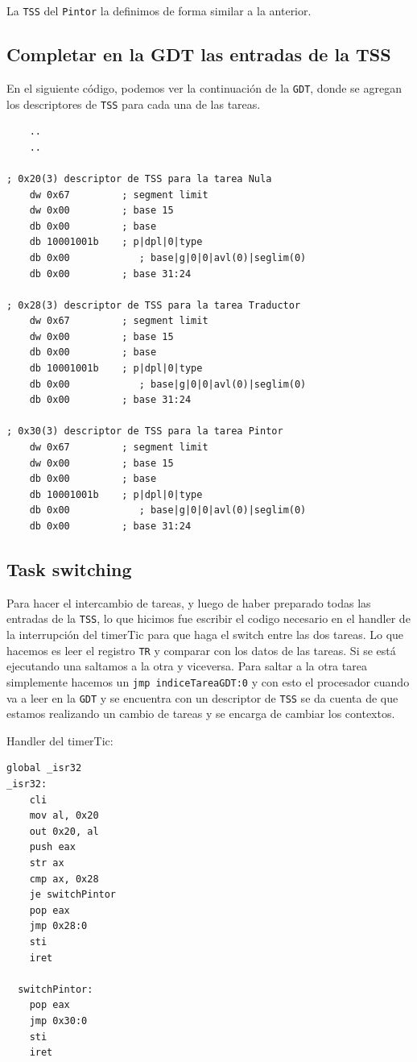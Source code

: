 \documentclass[a4paper, 10pt]{article}
\begin{document}
La \texttt{TSS} del \texttt{Pintor} la definimos de forma similar a la anterior.

\newpage

\subsection{Completar en la GDT las entradas de la TSS}
En el siguiente c\'odigo, podemos ver la continuaci\'on de la \texttt{GDT}, donde se agregan los descriptores de \texttt{TSS} para cada una de las tareas.

\vspace*{2em}

\lstset{language=[x86masm]Assembler}
\begin{lstlisting}
	..
	..

; 0x20(3) descriptor de TSS para la tarea Nula
	dw 0x67			; segment limit
	dw 0x00			; base 15
	db 0x00			; base
	db 10001001b	; p|dpl|0|type
	db 0x00 		   ; base|g|0|0|avl(0)|seglim(0)
	db 0x00			; base 31:24

; 0x28(3) descriptor de TSS para la tarea Traductor
	dw 0x67			; segment limit
	dw 0x00			; base 15
	db 0x00			; base
	db 10001001b	; p|dpl|0|type
	db 0x00 		   ; base|g|0|0|avl(0)|seglim(0)
	db 0x00			; base 31:24

; 0x30(3) descriptor de TSS para la tarea Pintor
	dw 0x67			; segment limit
	dw 0x00			; base 15
	db 0x00			; base
	db 10001001b	; p|dpl|0|type
	db 0x00 		   ; base|g|0|0|avl(0)|seglim(0)
	db 0x00			; base 31:24

\end{lstlisting}

\newpage

\subsection{Task switching}

Para hacer el intercambio de tareas, y luego de haber preparado todas las entradas de la \texttt{TSS}, lo que hicimos fue escribir el codigo necesario en el handler de la interrupci\'on del timerTic para que haga el switch entre las dos tareas.
Lo que hacemos es leer el registro \texttt{TR} y comparar con los datos de las tareas. Si se est\'a ejecutando una saltamos a la otra y viceversa. Para saltar a la otra tarea simplemente hacemos un \texttt {jmp indiceTareaGDT:0} y con esto el procesador cuando va a leer en la \texttt{GDT} y se encuentra con un descriptor de \texttt{TSS} se da cuenta de que estamos realizando un cambio de tareas y se encarga de cambiar los contextos. 

\vspace{1cm}
Handler del timerTic:

\lstset{language=[x86masm]Assembler}
\begin{lstlisting}
global _isr32
_isr32:
	cli		
	mov al, 0x20
	out 0x20, al
	push eax
	str ax
	cmp ax, 0x28
	je switchPintor
	pop eax
	jmp 0x28:0
	sti
	iret

  switchPintor:
    pop eax
	jmp 0x30:0
	sti
	iret
\end{lstlisting}
\vspace{1cm}
\end{document}
